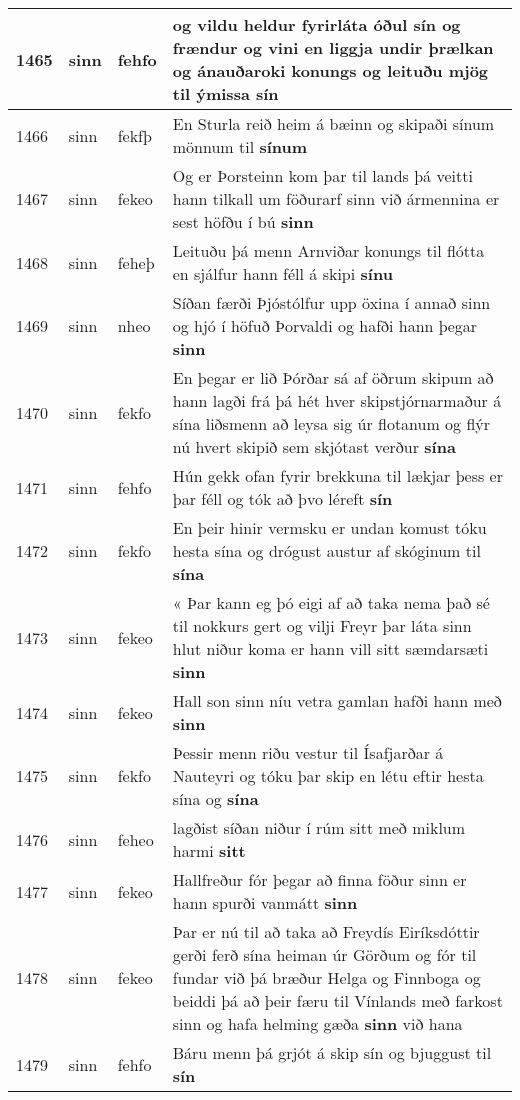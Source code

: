 \documentclass{article}
\begin{document}
\begin{longtable}{p{1cm}|p{1cm}|p{1cm}|p{13cm}}
\hline
1465&sinn&fehfo&og vildu heldur fyrirláta óðul sín og frændur og vini en liggja undir þrælkan og ánauðaroki konungs og leituðu mjög til ýmissa \textbf{sín} \\
\hline
1466&sinn&fekfþ&En Sturla reið heim á bæinn og skipaði sínum mönnum til \textbf{sínum} \\
\hline
1467&sinn&fekeo&Og er Þorsteinn kom þar til lands þá veitti hann tilkall um föðurarf sinn við ármennina er sest höfðu í bú \textbf{sinn} \\
\hline
1468&sinn&feheþ&Leituðu þá menn Arnviðar konungs til flótta en sjálfur hann féll á skipi \textbf{sínu} \\
\hline
1469&sinn&nheo&Síðan færði Þjóstólfur upp öxina í annað sinn og hjó í höfuð Þorvaldi og hafði hann þegar \textbf{sinn} \\
\hline
1470&sinn&fekfo&En þegar er lið Þórðar sá af öðrum skipum að hann lagði frá þá hét hver skipstjórnarmaður á sína liðsmenn að leysa sig úr flotanum og flýr nú hvert skipið sem skjótast verður \textbf{sína} \\
\hline
1471&sinn&fehfo&Hún gekk ofan fyrir brekkuna til lækjar þess er þar féll og tók að þvo léreft \textbf{sín} \\
\hline
1472&sinn&fekfo&En þeir hinir vermsku er undan komust tóku hesta sína og drógust austur af skóginum til \textbf{sína} \\
\hline
1473&sinn&fekeo&« Þar kann eg þó eigi af að taka nema það sé til nokkurs gert og vilji Freyr þar láta sinn hlut niður koma er hann vill sitt sæmdarsæti \textbf{sinn} \\
\hline
1474&sinn&fekeo&Hall son sinn níu vetra gamlan hafði hann með \textbf{sinn} \\
\hline
1475&sinn&fekfo&Þessir menn riðu vestur til Ísafjarðar á Nauteyri og tóku þar skip en létu eftir hesta sína og \textbf{sína} \\
\hline
1476&sinn&feheo&lagðist síðan niður í rúm sitt með miklum harmi \textbf{sitt} \\
\hline
1477&sinn&fekeo&Hallfreður fór þegar að finna föður sinn er hann spurði vanmátt \textbf{sinn} \\
\hline
1478&sinn&fekeo&Þar er nú til að taka að Freydís Eiríksdóttir gerði ferð sína heiman úr Görðum og fór til fundar við þá bræður Helga og Finnboga og beiddi þá að þeir færu til Vínlands með farkost sinn og hafa helming gæða \textbf{sinn} við hana\\
\hline
1479&sinn&fehfo&Báru menn þá grjót á skip sín og bjuggust til \textbf{sín} \\

\end{longtable}
\end{document}
